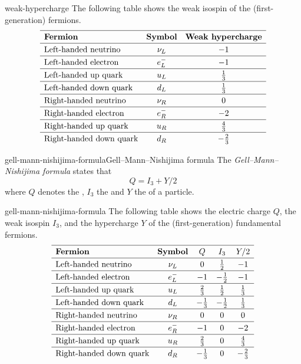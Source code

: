 \begin{example}{weak-hypercharge}
    The following table shows the weak isospin of the (first-generation) fermions.
    \[ \def\arraystretch{1.25} \begin{array}{lcc}
         \hline \textbf{Fermion} & \textbf{Symbol} & \textbf{Weak hypercharge} \\
         \hline \textup{Left-handed neutrino} & \nu_L & -1 \\
         \hline \textup{Left-handed electron} & e^-_L & -1 \\
         \hline \textup{Left-handed up quark} & u_L & \tfrac{1}{3} \\
         \hline \textup{Left-handed down quark} & d_L & \tfrac{1}{3} \\
         \hline \textup{Right-handed neutrino} & \nu_R & 0 \\
         \hline \textup{Right-handed electron} & e^-_R & -2 \\
         \hline \textup{Right-handed up quark} & u_R & \tfrac{4}{3} \\
         \hline \textup{Right-handed down quark} & d_R & - \tfrac{2}{3}
    \end{array} \]
\end{example}

\begin{topic}{gell-mann-nishijima-formula}{Gell--Mann--Nishijima formula}
    The \emph{Gell--Mann--Nishijima formula} states that
    \[ Q = I_3 + Y / 2 \]
    where $Q$ denotes the , $I_3$ the  and $Y$ the  of a particle.
\end{topic}

\begin{example}{gell-mann-nishijima-formula}
    The following table shows the electric charge $Q$, the weak isospin $I_3$, and the hypercharge $Y$ of the (first-generation) fundamental fermions.
    \[ \def\arraystretch{1.25} \begin{array}{lcccc}
         \hline \textbf{Fermion} & \textbf{Symbol} & Q & I_3 & Y / 2 \\
         \hline \textup{Left-handed neutrino} & \nu_L & 0 & \tfrac{1}{2} & -1 \\
         \hline \textup{Left-handed electron} & e^-_L & -1 & - \tfrac{1}{2} & -1 \\
         \hline \textup{Left-handed up quark} & u_L & \tfrac{2}{3} & \tfrac{1}{2} & \tfrac{1}{3} \\
         \hline \textup{Left-handed down quark} & d_L & - \tfrac{1}{3} & - \tfrac{1}{2} & \tfrac{1}{3} \\
         \hline \textup{Right-handed neutrino} & \nu_R & 0 & 0 & 0 \\
         \hline \textup{Right-handed electron} & e^-_R & -1 & 0 & -2 \\
         \hline \textup{Right-handed up quark} & u_R & \tfrac{2}{3} & 0 & \tfrac{4}{3} \\
         \hline \textup{Right-handed down quark} & d_R & - \tfrac{1}{3} & 0 & - \tfrac{2}{3}
    \end{array} \]
\end{example}

